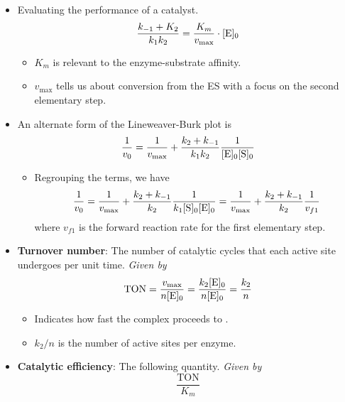 \documentclass[../notes.tex]{subfiles}
\begin{document}
\begin{itemize}
    \item Evaluating the performance of a catalyst.
    \begin{equation*}
        \frac{k_{-1}+K_2}{k_1k_2} = \frac{K_m}{v_\text{max}}\cdot\cnc[0]{E}
    \end{equation*}
    \begin{itemize}
        \item $K_m$ is relevant to the enzyme-substrate affinity.
        \item $v_\text{max}$ tells us about conversion from the ES with a focus on the second elementary step.
    \end{itemize}
    \item An alternate form of the Lineweaver-Burk plot is
    \begin{equation*}
        \frac{1}{v_0} = \frac{1}{v_\text{max}}+\frac{k_2+k_{-1}}{k_1k_2}\frac{1}{\cnc[0]{E}\cnc[0]{S}}
    \end{equation*}
    \begin{itemize}
        \item Regrouping the terms, we have
        \begin{equation*}
            \frac{1}{v_0} = \frac{1}{v_\text{max}}+\frac{k_2+k_{-1}}{k_2}\frac{1}{k_1\cnc[0]{S}\cnc[0]{E}}
            = \frac{1}{v_\text{max}}+\frac{k_2+k_{-1}}{k_2}\frac{1}{v_{f1}}
        \end{equation*}
        where $v_{f1}$ is the forward reaction rate for the first elementary step.
    \end{itemize}
    \item \textbf{Turnover number}: The number of catalytic cycles that each active site undergoes per unit time. \emph{Given by}
    \begin{equation*}
        \text{TON} = \frac{v_\text{max}}{n\cnc[0]{E}}
        = \frac{k_2\cnc[0]{E}}{n\cnc[0]{E}}
        = \frac{k_2}{n}
    \end{equation*}
    \begin{itemize}
        \item Indicates how fast the  complex proceeds to .
        \item $k_2/n$ is the number of active sites per enzyme.
    \end{itemize}
    \item \textbf{Catalytic efficiency}: The following quantity. \emph{Given by}
    \begin{equation*}
        \frac{\text{TON}}{K_m}
    \end{equation*}

\end{itemize}
\end{document}
